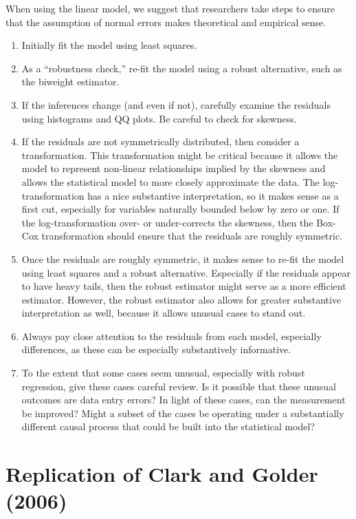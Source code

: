 \documentclass[12pt]{article}
\begin{document}
When using the linear model, we suggest that researchers take steps to ensure that the assumption of normal errors makes theoretical and empirical sense. 
\begin{enumerate}
	\item Initially fit the model using least squares. 
	\item As a ``robustness check,'' re-fit the model using a robust alternative, such as the biweight estimator. 
	\item If the inferences change (and even if not), carefully examine the residuals using histograms and QQ plots. Be careful to check for skewness.
	\item If the residuals are not symmetrically distributed, then consider a transformation. 
	This transformation might be critical because it allows the model to represent non-linear relationships implied by the skewness and allows the statistical model to more closely approximate the data. 
	The log-transformation has a nice substantive interpretation, so it makes sense as a first cut, especially for variables naturally bounded below by zero or one. 
	If the log-transformation over- or under-corrects the skewness, then the Box-Cox transformation should ensure that the residuals are roughly symmetric.
	\item Once the residuals are roughly symmetric, it makes sense to re-fit the model using least squares and a robust alternative. 
	Especially if the residuals appear to have heavy tails, then the robust estimator might serve as a more efficient estimator. 
	However, the robust estimator also allows for greater substantive interpretation as well, because it allows unusual cases to stand out.
	\item Always pay close attention to the residuals from each model, especially differences, as these can be especially substantively informative.
	\item To the extent that some cases seem unusual, especially with robust regression, give these cases careful review. 
	Is it possible that these unusual outcomes are  data entry errors? 
	In light of these cases, can the measurement be improved? 
	Might a subset of the cases be operating under a substantially different causal process that could be built into the statistical model? 
\end{enumerate}

\section*{Replication of Clark and Golder (2006)}
\end{document}
